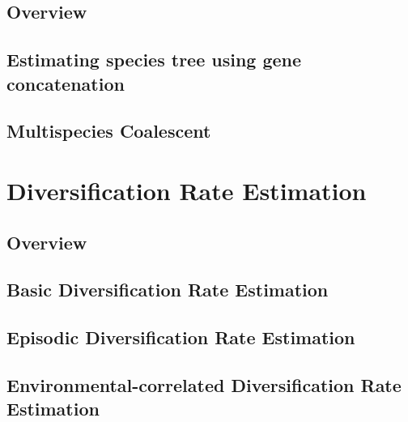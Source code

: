 \documentclass[11pt]{book}
\begin{document}
\chapter{Overview}
\def \ResourcePath {RB_GTST_Tutorial/}


\chapter{Estimating species tree using gene concatenation}
\def \ResourcePath {RB_GeneConcatenation_Tutorial/}


\chapter{Multispecies Coalescent}
\def \ResourcePath {RB_MultispeciesCoalescent_Tutorial/}




\part{Diversification Rate Estimation}

\chapter{Overview}
\def \ResourcePath {RB_DiversificationRateIntro_Tutorial/}


\chapter{Basic Diversification Rate Estimation}
\def \ResourcePath {RB_DiversificationRate_Tutorial/}


\chapter{Episodic Diversification Rate Estimation}
\def \ResourcePath {RB_DiversificationRate_Episodic_Tutorial/}


\chapter{Environmental-correlated Diversification Rate Estimation}
\def \ResourcePath {RB_DiversificationRate_Environmental_Tutorial/}

\end{document}
